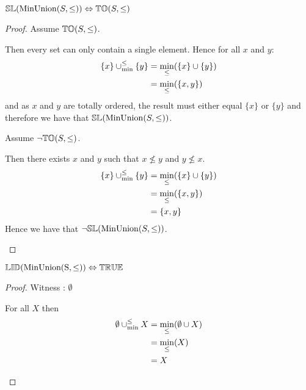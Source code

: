 \begin{theorem} \label{thm:minunion_sl}
${\mathbb{SL}}(\mathrm{MinUnion}(S,\leq)) \Leftrightarrow {\mathbb{TO}}(S,\leq)$
\end{theorem}

\begin{proof}
Assume ${\mathbb{TO}}(S,\leq)$.

\begin{ind}
Then every set can only contain a single element. Hence for all $x$ and $y$:
\begin{align*}
\{ x \} \mathbin{\cup_{\min}^{\leq}} \{ y \} 	& = \min_\leq(\{ x \} \cup \{ y \}) \\
							& = \min_\leq(\{ x , y \}) 
\end{align*}
and as $x$ and $y$ are totally ordered, the result must either equal $\{ x \}$ or $\{ y \}$ and therefore we have that ${\mathbb{SL}}(\mathrm{MinUnion}(S,\leq))$.
\end{ind}

Assume $\neg {\mathbb{TO}}(S,\leq)$.

\begin{ind}
Then there exists $x$ and $y$ such that $x \nleq y$ and $y \nleq x$.
\begin{align*}
\{ x \} \mathbin{\cup_{\min}^{\leq}} \{ y \} 	& = \min_\leq(\{ x \} \cup \{ y \}) \\
							& = \min_\leq(\{ x , y \}) \\
							& = \{ x , y \}
\end{align*}
Hence we have that $\neg {\mathbb{SL}}(\mathrm{MinUnion}(S,\leq))$.
\end{ind}
\end{proof}





\begin{theorem} \label{thm:minunion_lid}
${\mathbb{LID}}(\mathrm{MinUnion(S,\leq)}) \Leftrightarrow {\mathbb{TRUE}}$
\end{theorem}

\begin{proof}

\vspace{0.5em}

Witness : $\emptyset$
\begin{ind}
For all $X$ then
\begin{align*}
\emptyset \mathbin{\cup_{\min}^{\leq}} X 	& = \min_\leq(\emptyset \cup X) \\
						& = \min_\leq(X) \\
						& = X
\end{align*}
\end{ind}
\end{proof}




